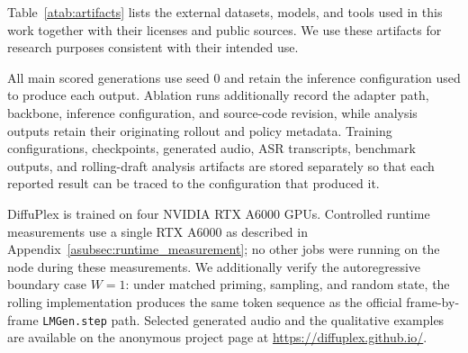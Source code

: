Table~\ref{atab:artifacts} lists the external datasets, models, and tools used in this work together with their licenses and public sources.
We use these artifacts for research purposes consistent with their intended use.



All main scored generations use seed 0 and retain the inference configuration used to produce each output.
Ablation runs additionally record the adapter path, backbone, inference configuration, and source-code revision, while analysis outputs retain their originating rollout and policy metadata.
Training configurations, checkpoints, generated audio, ASR transcripts, benchmark outputs, and rolling-draft analysis artifacts are stored separately so that each reported result can be traced to the configuration that produced it.

DiffuPlex is trained on four NVIDIA RTX A6000 GPUs.
Controlled runtime measurements use a single RTX A6000 as described in Appendix~\ref{asubsec:runtime_measurement}; no other jobs were running on the node during these measurements.
We additionally verify the autoregressive boundary case $W=1$: under matched priming, sampling, and random state, the rolling implementation produces the same token sequence as the official frame-by-frame \texttt{LMGen.step} path.
Selected generated audio and the qualitative examples are available on the anonymous project page at
\url{https://diffuplex.github.io/}.